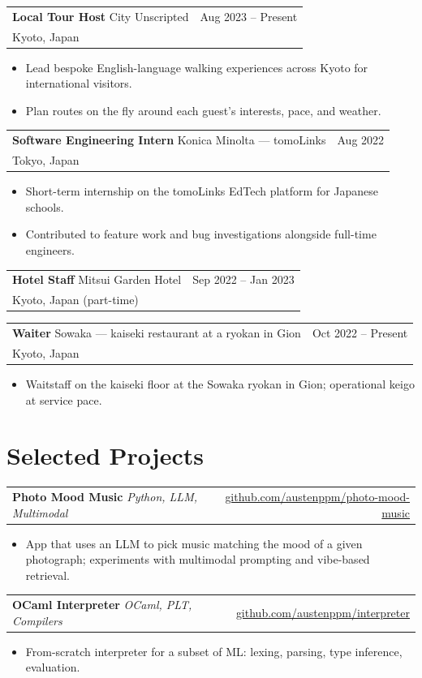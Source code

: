 \documentclass[11pt,a4paper]{article}
\makeatletter
\newcommand{\role}[4]{%
  \noindent
  \begin{tabular*}{\linewidth}{@{\extracolsep{\fill}}l r}
    \textbf{#1} \textcolor{muted}{\textbar{}} #2 & \textcolor{muted}{#3}\\[-1pt]
    \textcolor{muted}{\small #4} &
  \end{tabular*}\par\vspace{-2pt}
}
\newcommand{\project}[4]{%
  \noindent
  \begin{tabular*}{\linewidth}{@{\extracolsep{\fill}}l r}
    \textbf{#1} \textcolor{muted}{\textbar{}} \textit{\small #2} & \href{#4}{\small\color{accent} #3}\\
  \end{tabular*}\par\vspace{-2pt}
}
\newenvironment{bullets}
  {\begin{itemize}[leftmargin=1.1em, itemsep=1pt, parsep=0pt, topsep=2pt]}
  {\end{itemize}}
\makeatother
\begin{document}
\role
  {Local Tour Host}
  {City Unscripted}
  {Aug 2023 -- Present}
  {Kyoto, Japan}
\begin{bullets}
  \item Lead bespoke English-language walking experiences across Kyoto for international visitors.
  \item Plan routes on the fly around each guest's interests, pace, and weather.
\end{bullets}

\role
  {Software Engineering Intern}
  {Konica Minolta --- tomoLinks}
  {Aug 2022}
  {Tokyo, Japan}
\begin{bullets}
  \item Short-term internship on the tomoLinks EdTech platform for Japanese schools.
  \item Contributed to feature work and bug investigations alongside full-time engineers.
\end{bullets}

\role
  {Hotel Staff}
  {Mitsui Garden Hotel}
  {Sep 2022 -- Jan 2023}
  {Kyoto, Japan (part-time)}

\role
  {Waiter}
  {Sowaka --- kaiseki restaurant at a ryokan in Gion}
  {Oct 2022 -- Present}
  {Kyoto, Japan}
\begin{bullets}
  \item Waitstaff on the kaiseki floor at the Sowaka ryokan in Gion; operational keigo at service pace.
\end{bullets}

\section{Selected Projects}

\project{Photo Mood Music}{Python, LLM, Multimodal}{github.com/austenppm/photo-mood-music}{https://github.com/austenppm/photo-mood-music}
\begin{bullets}
  \item App that uses an LLM to pick music matching the mood of a given photograph; experiments with multimodal prompting and vibe-based retrieval.
\end{bullets}

\project{OCaml Interpreter}{OCaml, PLT, Compilers}{github.com/austenppm/interpreter}{https://github.com/austenppm/interpreter}
\begin{bullets}
  \item From-scratch interpreter for a subset of ML: lexing, parsing, type inference, evaluation.
\end{bullets}
\end{document}
